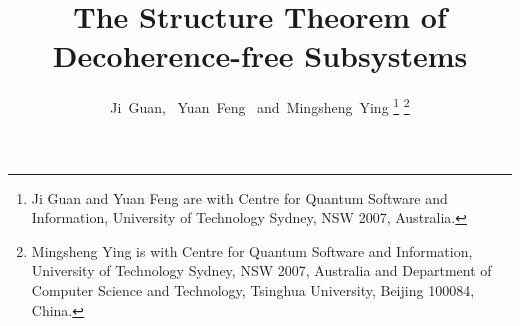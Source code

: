 \documentclass[journal]{IEEEtran}
\begin{document}
%
\title{The Structure Theorem of Decoherence-free Subsystems}
%
%
%

\author{Ji~Guan,%
        ~Yuan~Feng%
        ~and~Mingsheng~Ying%
\thanks{Ji Guan and Yuan Feng are with Centre for Quantum Software and Information,
University of Technology Sydney, NSW 2007, Australia.}%
\thanks{Mingsheng Ying is with Centre for Quantum Software and Information,
University of Technology Sydney, NSW 2007, Australia and Department of Computer Science and Technology, Tsinghua University, Beijing 100084, China.}}%

% 
%
\end{document}

